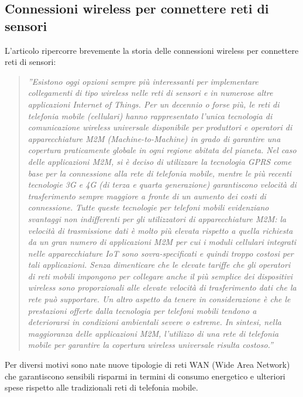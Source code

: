 \documentclass[a4paper]{report} %
\begin{document}
\subsection{Connessioni wireless per connettere reti di sensori}
L'articolo \cite{art:rif.23} ripercorre brevemente la storia delle connessioni wireless per connettere reti di sensori:
\begin{quote}
	\textit{''Esistono oggi opzioni sempre più interessanti per implementare collegamenti di tipo wireless nelle reti di sensori e in numerose altre applicazioni Internet of Things. Per un decennio o forse più, le reti di telefonia mobile (cellulari) hanno rappresentato l'unica tecnologia di comunicazione wireless universale disponibile per produttori e operatori di apparecchiature M2M (Machine-to-Machine) in grado di garantire una copertura praticamente globale in ogni regione abitata del pianeta. Nel caso delle applicazioni M2M, si è deciso di utilizzare la tecnologia GPRS come base per la connessione alla rete di telefonia mobile, mentre le più recenti tecnologie 3G e 4G (di terza e quarta generazione) garantiscono velocità di trasferimento sempre maggiore a fronte di un aumento dei costi di connessione. Tutte queste tecnologie per telefoni mobili evidenziano svantaggi non indifferenti per gli utilizzatori di apparecchiature M2M: la velocità di trasmissione dati è molto più elevata rispetto a quella richiesta da un gran numero di applicazioni M2M per cui i moduli cellulari integrati nelle apparecchiature IoT sono sovra-specificati e quindi troppo costosi per tali applicazioni. Senza dimenticare che le elevate tariffe che gli operatori di reti mobili impongono per collegare anche il più semplice dei dispositivi wireless sono proporzionali alle elevate velocità di trasferimento dati che la rete può supportare. Un altro aspetto da tenere in considerazione è che le prestazioni offerte dalla tecnologia per telefoni mobili tendono a deteriorarsi in condizioni ambientali severe o estreme. In sintesi, nella maggioranza delle applicazioni M2M, l'utilizzo di una rete di telefonia mobile per garantire la copertura wireless universale risulta costoso.''}
\end{quote}
Per diversi motivi sono nate nuove tipologie di reti WAN (Wide Area Network) che garantiscono sensibili risparmi in termini di consumo energetico e ulteriori spese rispetto alle tradizionali reti di telefonia mobile.
\end{document}
